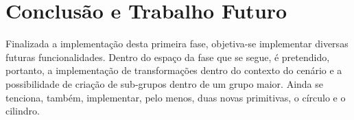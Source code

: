 \section{Conclusão e Trabalho Futuro}

Finalizada a implementação desta primeira fase, objetiva-se implementar
diversas futuras funcionalidades.\newline
\break
\noindent
Dentro do espaço da fase que se segue, é pretendido, portanto,
a implementação de transformações dentro do contexto do cenário e
a possibilidade de criação de sub-grupos dentro de um grupo maior. Ainda
se tenciona, também, implementar, pelo menos, duas novas
primitivas, o círculo e o cilindro.
